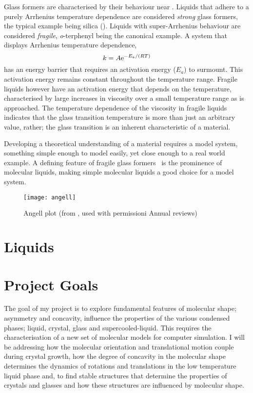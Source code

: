Glass formers are characterised by their behaviour near \si{\Tg}. Liquids that adhere to a purely Arrhenius temperature dependence are considered \emph{strong} glass formers, the typical example being silica (). Liquids with super-Arrhenius behaviour are considered \emph{fragile}, \emph{o}-terphenyl being the canonical example. A system that displays Arrhenius temperature dependence,
\begin{equation}
    k = A \text{e}^{-E_a/(RT)}
\end{equation}
has an energy barrier that requires an activation energy ($E_a$) to surmount. This activation energy remains constant throughout the temperature range. Fragile liquids however have an activation energy that depends on the temperature\tocite, characterised by large increases in viscosity over a small temperature range as \si{\Tg} is approached. The temperature dependence of the viscosity in fragile liquids indicates that the glass transition temperature is more than just an arbitrary value, rather; the glass transition is an inherent characteristic of a material.

Developing a theoretical understanding of a material requires a model system, something simple enough to model easily, yet close enough to a real world example. A defining feature of fragile glass formers~\tabref{} is the prominence of molecular liquids, making simple molecular liquids a good choice for a model system.


\begin{figure}
    \texttt{[image: angell]}
    \caption{Angell plot (from \textcite{lubchenko:07}, used with permissioni Annual reviews)}
    \label{fig:entropy}
\end{figure}

\section{Liquids}

\section{Project Goals}

The goal of my project is to explore fundamental features of molecular shape; asymmetry and concavity, influence the properties of the various condensed phases; liquid, crystal, glass and supercooled-liquid. This requires the characterisation of a new set of molecular models for computer simulation. I will be addressing how the molecular orientation and translational motion couple during crystal growth, how the degree of concavity in the molecular shape determines the dynamics of rotations and translations in the low temperature liquid phase and, to find stable structures that determine the properties of crystals and glasses and how these structures are influenced by molecular shape.

